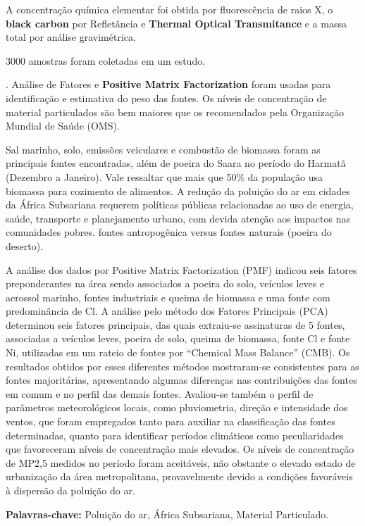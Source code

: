 A concentração química elementar foi obtida por fluorescência de raios X, 
o \textbf{black carbon} por Refletância e \textbf{Thermal Optical Transmitance} 
e a massa total por análise gravimétrica.

3000 amostras foram coletadas em um estudo. 
\citep{zhou2011}
\citep{zhou2014chemical}


. Análise de Fatores e \textbf{Positive Matrix Factorization} foram usadas para identificação e 
estimativa do peso das fontes. Os níveis de concentração de material particulados são bem maiores que os 
recomendados pela Organização Mundial de Saúde (OMS).%
 
Sal marinho, solo, emissões veiculares e combustão de biomassa foram as principais fontes encontradas, além 
de poeira do Saara no período do Harmatã (Dezembro a Janeiro). Vale ressaltar que mais que 50\% da população 
usa biomassa para cozimento de alimentos. A redução da poluição do ar em cidades da África Subsariana requerem 
políticas públicas relacionadas ao uso de energia, saúde, transporte e planejamento urbano, com devida atenção 
aos impactos nas comunidades pobres.
fontes antropogênica versus fontes naturais (poeira do deserto).



 A análise dos dados por Positive Matrix Factorization (PMF) indicou seis fatores preponderantes na área sendo associados a poeira do solo, veículos leves e aerossol marinho, fontes industriais e queima de biomassa e uma fonte com predominância de Cl. A análise pelo método dos Fatores Principais (PCA) determinou seis fatores principais, das quais extraiu-se assinaturas de 5 fontes, associadas a veículos leves, poeira de solo, queima de biomassa, fonte Cl e fonte Ni, utilizadas em um rateio de fontes por “Chemical Mass Balance” (CMB). Os resultados obtidos por esses diferentes métodos mostraram-se consistentes para as fontes majoritárias, apresentando algumas diferenças nas contribuições das fontes em comum e no perfil das demais fontes. Avaliou-se também o perfil de parâmetros meteorológicos locais, como pluviometria, direção e intensidade dos ventos, que foram empregados tanto para auxiliar na classificação das fontes determinadas, quanto para identificar períodos climáticos como peculiaridades que favoreceram níveis de concentração mais elevados. Os níveis de concentração de MP2,5 medidos no período foram aceitáveis, não obstante o elevado estado de urbanização da área metropolitana, provavelmente devido a condições favoráveis à dispersão da poluição do ar.



\par
\vspace{1em}
\noindent\textbf{Palavras-chave:}  Poluição do ar, África Subsariana, Material Particulado.
\newpage
